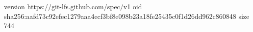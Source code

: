 version https://git-lfs.github.com/spec/v1
oid sha256:aafd73c92efec1279aaa4ecf3bf8e098b23a18fe25435c0f1d26dd962c860848
size 744
